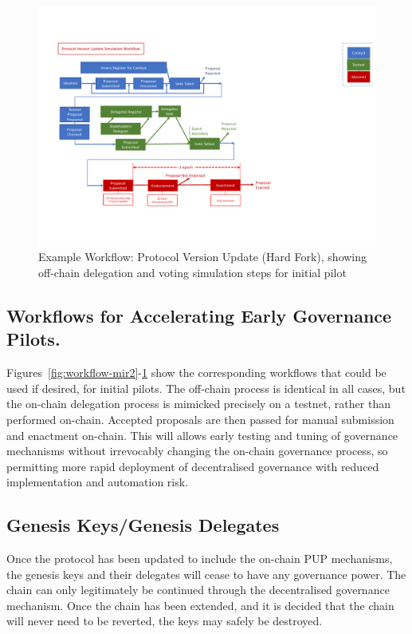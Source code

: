 \begin{figure}
  \includegraphics[trim=0 90 0 80,clip,width=\textwidth]{Workflow4}
  \caption{Example Workflow: Protocol Version Update (Hard Fork), showing off-chain delegation and voting simulation steps for initial pilot}
  \label{fig:workflow-hf2}
\end{figure}

\subsection{Workflows for Accelerating Early Governance Pilots.}
\label{sect:pilot-workflows}

Figures~\ref{fig:workflow-mir2}-\ref{fig:workflow-hf2} show the corresponding  workflows that could be used if desired,
for initial pilots.  The off-chain process is identical in all cases, but the on-chain delegation process is mimicked precisely on a testnet, rather than performed
on-chain.  Accepted proposals are then passed for manual submission and enactment on-chain.  This will allows early testing and tuning of governance mechanisms without
irrevocably changing the on-chain governance process, so permitting more rapid deployment of decentralised governance with reduced implementation and automation risk.

\subsection{Genesis Keys/Genesis Delegates}

Once the protocol has been updated to include the on-chain PUP mechanisms, the
genesis keys and their delegates will cease to have any governance power.  The
chain can only legitimately be continued through the decentralised governance
mechanism.  Once the chain has been extended, and it is decided that the chain
will never need to be reverted, the keys may safely be destroyed.
